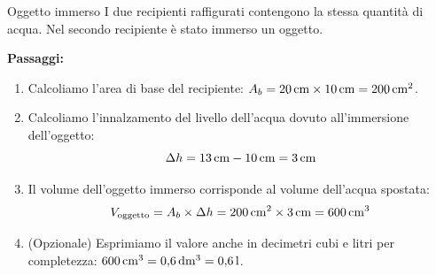 \condnewpage
\begin{esercizio}{Oggetto immerso}
I due recipienti raffigurati contengono la stessa quantità di acqua. Nel secondo recipiente è stato immerso un oggetto.



\responsespace{8cm}

\begin{soluzione}
  \textbf{Passaggi:}
  \begin{enumerate}
    \item Calcoliamo l'area di base del recipiente: $A_b = 20\,\mathrm{cm} \times 10\,\mathrm{cm} = 200\,\mathrm{cm^2}$.
    \item Calcoliamo l'innalzamento del livello dell'acqua dovuto all'immersione dell'oggetto:
    \[
    \Delta h = 13\,\mathrm{cm} - 10\,\mathrm{cm} = 3\,\mathrm{cm}
    \]
    \item Il volume dell'oggetto immerso corrisponde al volume dell'acqua spostata:
    \[
    V_{\text{oggetto}} = A_b \times \Delta h = 200\,\mathrm{cm^2} \times 3\,\mathrm{cm} = 600\,\mathrm{cm^3}
    \]
    \item (Opzionale) Esprimiamo il valore anche in decimetri cubi e litri per completezza: $600\,\mathrm{cm^3} = 0{,}6\,\mathrm{dm^3} = 0{,}6\,\mathrm{l}$.
  \end{enumerate}
\end{soluzione}
\end{esercizio}


